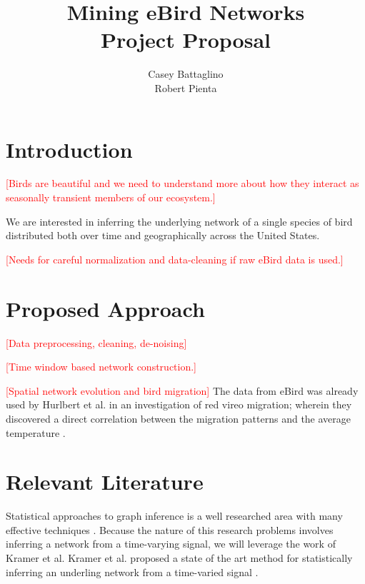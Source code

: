 \documentclass[11pt]{article}
\title{Mining eBird Networks\\ Project Proposal\vspace{-8pt}}
\author{Casey Battaglino\\Robert Pienta}
\date{}
\newcommand{\tod}[1]{\textcolor{red}{[#1]}}
\begin{document}
\maketitle
\begin{multicols}{2}
\section*{Introduction} \vspace{-10 pt}

\tod{Birds are beautiful and we need to understand more about how they interact as seasonally transient members of our ecosystem.}


We are interested in inferring the underlying network of a single species of bird distributed both over time and geographically across the United States.

\tod{Needs for careful normalization and data-cleaning if raw eBird data is used.}

\section*{Proposed Approach} \vspace{-10 pt}
\tod{Data preprocessing, cleaning, de-noising}


\tod{Time window based network construction.}


\tod{Spatial network evolution and bird migration}
The data from eBird was already used by Hurlbert et al. in an investigation of red vireo migration; wherein they discovered a direct correlation between the migration patterns and the average temperature \cite{hurlbert}. 

\section*{Relevant Literature}
Statistical approaches to graph inference is a well researched area with many effective techniques \cite{AlbertMechanics}.
Because the nature of this research problems involves inferring a network from a time-varying signal, we will leverage the work of Kramer et al. 
Kramer et al. proposed a state of the art method for statistically inferring an underling network from a time-varied signal \cite{kramer}.


\end{multicols}
\end{document}
